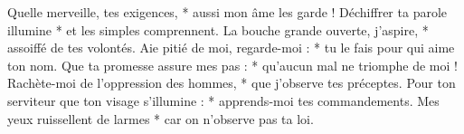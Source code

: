 Quelle merveille, tes exigences, *
aussi mon âme les garde !
\versseparator
Déchiffrer ta parole illumine *
et les simples comprennent.
\versseparator
La bouche grande ouverte, j’aspire, *
assoiffé de tes volontés.
\versseparator
Aie pitié de moi, regarde-moi : *
tu le fais pour qui aime ton nom.
\versseparator
Que ta promesse assure mes pas : *
qu’aucun mal ne triomphe de moi !
\versseparator
Rachète-moi de l’oppression des hommes, *
que j’observe tes préceptes.
\versseparator
Pour ton serviteur que ton visage s’illumine : *
apprends-moi tes commandements.
\versseparator
Mes yeux ruissellent de larmes *
car on n’observe pas ta loi.
